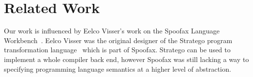 \documentclass[a4paper,UKenglish,cleveref, autoref, thm-restate, anonymous]{oasics-v2021}
\begin{document}
% 
% 


%
%


\section{Related Work}\label{sec:related}

Our work is influenced by Eelco Visser's work on the Spoofax Language Workbench~\cite{10.1145/1869459.1869497}. 
Eelco Visser was the original designer of the Stratego program transformation language~\cite{10.1007/3-540-45127-7_27} which is part of Spoofax. 
Stratego can be used to implement a whole compiler back end, however Spoofax was still lacking a way to specifying programming language semantics at a higher level of abstraction.
\end{document}
